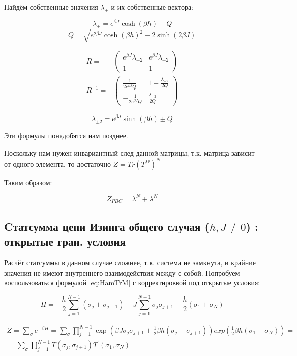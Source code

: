 \documentclass{article}
\newcommand{\bj}{\beta J}
\newcommand{\bh}{\beta h}
\newcommand{\lpm}{\lambda_{\pm}}
\newcommand{\lpd}{\lambda_{+2}}
\newcommand{\lmd}{\lambda_{-2}}
\newcommand{\lpmd}{\lambda_{\pm2}}
\newcommand{\pbc}{_{PBC}}
\numberwithin{equation}{section}
\begin{document}
Найдём собственные значения $\lpm$ и их собственные вектора:

\[ \lpm = e^{\bj}  \cosh{(\bh)} \pm Q\]
\[ Q = \sqrt{e^{2\bj} \cosh{(\bh)}^{2} - 2 \sinh{(2\bj)}} \]

\begin{align}\label{R}
R = &
\begin{pmatrix*}
  e^{\bj}\lpd & e^{\bj}\lmd \\
  1 & 1
\end{pmatrix*}\\
\label{RInv}
R^{-1} = &
\begin{pmatrix*}
  \frac{1}{2e^{\bj}Q} & 1-\frac{\lpd}{2Q} \\
  -\frac{1}{2e^{\bj}Q} & \frac{\lpd}{2Q}
\end{pmatrix*}
\end{align}

\[ \lpmd = e^{\bj}  \sinh{(\bh)} \pm Q\]

Эти формулы понадобятся нам позднее.

Поскольку нам нужен инвариантный след данной матрицы, т.к. матрица зависит от одного элемента, то достаточно $ Z = Tr(T^{D})^{N} $

Таким образом:

\begin{equation}\label{Zpbc}
Z\pbc = \lambda_{+}^{N} + \lambda _{-} ^{N}     
\end{equation}

\subsection{Cтатсумма цепи Изинга общего случая ($h, J \neq 0 $) : открытые гран. условия}

Расчёт статсуммы в данном случае сложнее, т.к. система не замкнута, и крайние значения не имеют внутреннего взаимодействия между с собой. Попробуем воспользоваться формулой \eqref{eq:HamTrM} с корректировкой под открытые условия:

\begin{equation}\label{eq:HamTrM2}
    H = - \frac{h}{2}\sum_{j = 1}^{N-1}  (\sigma_{j} + \sigma_{j+1}) - J \sum_{j = 1}^{N-1} \sigma_{j}  \sigma_{j+1} - \frac{h}{2}(\sigma_{1} + \sigma_{N})
\end{equation}

\begin{align*}\label{ZTrM}
    Z = \sum_{\sigma} e^{-\beta H} = \sum_{\sigma} \prod_{j=1}^{N-1} \exp{(\bj\sigma_{j}\sigma_{j+1} + \frac{1}{2}\bh(\sigma_{j} + \sigma_{j+1}))} exp(\frac{1}{2}\bh(\sigma_{1}+\sigma_{N})) = \\
    = \sum_{\sigma} \prod_{j=1}^{N-1} T(\sigma_{j}, \sigma_{j+1}) T^{'}(\sigma_{1}, \sigma_{N})
\end{align*}
\end{document}
